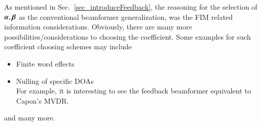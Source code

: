 As mentioned in Sec.~\ref{sec_introduceFeedback}, the reasoning for the selection of $\boldsymbol{\alpha}, \boldsymbol{\beta}$ as the conventional beamformer generalization, was the FIM related information considerations.
Obviously, there are many more possibilities/considerations to choosing the coefficient.
Some examples for such coefficient choosing schemes may include
\begin{itemize}
    \item Finite word effects
    \item Nulling of specific DOAs \\
    For example, it is interesting to see the feedback beamformer equivalent to Capon's \cite{capon1969high} MVDR. 
\end{itemize}
and many more.